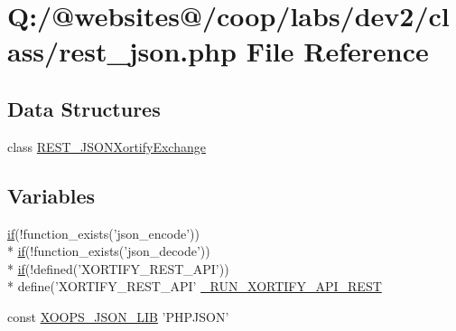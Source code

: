 \hypertarget{rest__json_8php}{\section{Q\-:/@websites@/coop/labs/dev2/class/rest\-\_\-json.php File Reference}
\label{rest__json_8php}
}
\subsection*{Data Structures}
\begin{DoxyCompactItemize}
\item 
class \hyperlink{class_r_e_s_t___j_s_o_n_xortify_exchange}{R\-E\-S\-T\-\_\-\-J\-S\-O\-N\-Xortify\-Exchange}
\end{DoxyCompactItemize}
\subsection*{Variables}
\begin{DoxyCompactItemize}
\item 
\hyperlink{index_8php_ae2ccdf355624402b65fc2226f2a661cd}{if}(!function\-\_\-exists('json\-\_\-encode')) \\*
\hyperlink{index_8php_ae2ccdf355624402b65fc2226f2a661cd}{if}(!function\-\_\-exists('json\-\_\-decode')) \\*
\hyperlink{index_8php_ae2ccdf355624402b65fc2226f2a661cd}{if}(!defined('X\-O\-R\-T\-I\-F\-Y\-\_\-\-R\-E\-S\-T\-\_\-\-A\-P\-I')) \\*
define('X\-O\-R\-T\-I\-F\-Y\-\_\-\-R\-E\-S\-T\-\_\-\-A\-P\-I' \hyperlink{rest__json_8php_afdc545ca06d322c86eccc65ea3f38868}{\-\_\-\-R\-U\-N\-\_\-\-X\-O\-R\-T\-I\-F\-Y\-\_\-\-A\-P\-I\-\_\-\-R\-E\-S\-T}
\item 
const \hyperlink{rest__json_8php_a42fbc26b113afc08a5757bacf456cd8a}{X\-O\-O\-P\-S\-\_\-\-J\-S\-O\-N\-\_\-\-L\-I\-B} 'P\-H\-P\-J\-S\-O\-N'
\end{DoxyCompactItemize}


